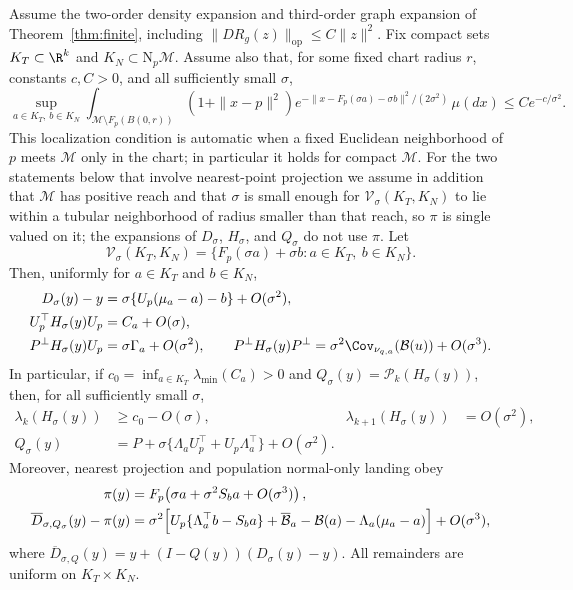 \documentclass[10pt]{article}
\theoremstyle{c2fup}
\newcommand{\M}{\mathcal{M}}
\newcommand{\N}{\mathrm{N}}
\newcommand{\op}{\mathrm{op}}
\begin{document}
\begin{theorem}
\label{thm:normal-boundary}
Assume the two-order density expansion and third-order graph expansion of
Theorem~\ref{thm:finite}, including
$\|DR_g(z)\|_\op\le C\|z\|^2$.  Fix compact sets
$K_T\subset\R^k$ and $K_N\subset\N_p\M$.  Assume also that, for some fixed chart radius
$r$, constants $c,C>0$, and all sufficiently small $\sigma$,
\begin{equation}
  \sup_{a\in K_T,\,b\in K_N}
  \int_{\M\setminus F_p(B(0,r))}
  (1+\|x-p\|^2)
  e^{-\|x-F_p(\sigma a)-\sigma b\|^2/(2\sigma^2)}\,\mu(dx)
  \le Ce^{-c/\sigma^2}.
  \label{eq:normal-boundary-localization}
\end{equation}
This localization condition is automatic when a fixed Euclidean
neighborhood of $p$ meets $\M$ only in the chart; in particular it holds
for compact $\M$.  For the two statements below that involve nearest-point projection we assume in addition that $\M$ has positive reach and that $\sigma$ is small enough for
$\mathcal V_\sigma(K_T,K_N)$ to lie within a tubular neighborhood of radius
smaller than that reach, so $\pi$ is single valued on it; the expansions of
$D_\sigma$, $H_\sigma$, and $Q_\sigma$ do not use $\pi$.  Let
\begin{equation}
  \mathcal V_\sigma(K_T,K_N)
  =\{F_p(\sigma a)+\sigma b:a\in K_T,\ b\in K_N\}.
  \label{eq:normal-boundary-set}
\end{equation}
Then, uniformly for $a\in K_T$ and $b\in K_N$,
\begin{align}
  D_\sigma(y)-y
  &=\sigma\{U_p(\mu_a-a)-b\}+O(\sigma^2),
  \label{eq:normal-boundary-mean}\\
  U_p^\top H_\sigma(y)U_p
  &=C_a+O(\sigma),\nonumber\\
  P^\perp H_\sigma(y)U_p
  &=\sigma\Gamma_a+O(\sigma^2),\qquad
  P^\perp H_\sigma(y)P^\perp
  =\sigma^2\Cov_{\nu_{q,a}}(\mathcal B(u))+O(\sigma^3).
  \label{eq:normal-boundary-blocks}
\end{align}
In particular, if $c_0=\inf_{a\in K_T}\lambda_{\min}(C_a)>0$ and
$Q_\sigma(y)=\mathcal P_k(H_\sigma(y))$, then, for all sufficiently small
$\sigma$,
\begin{align}
  \lambda_k(H_\sigma(y))&\ge c_0-O(\sigma),&
  \lambda_{k+1}(H_\sigma(y))&=O(\sigma^2),
  \label{eq:normal-boundary-gap}\\
  Q_\sigma(y)
  &=P+\sigma\{\Lambda_aU_p^\top+U_p\Lambda_a^\top\}
    +O(\sigma^2).
  \label{eq:normal-boundary-projector}
\end{align}
Moreover, nearest projection and population normal-only landing obey
\begin{align}
  \pi(y)
  &=F_p\!\left(\sigma a+\sigma^2S_ba+O(\sigma^3)\right),
  \label{eq:normal-boundary-projection}\\
  \overline D_{\sigma,Q_\sigma}(y)-\pi(y)
  &=\sigma^2\Bigl[
      U_p\{\Lambda_a^\top b-S_ba\}
      +\overline{\mathcal B}_a-\mathcal B(a)
      -\Lambda_a(\mu_a-a)
    \Bigr]+O(\sigma^3),
  \label{eq:normal-boundary-landing}
\end{align}
where
$\overline D_{\sigma,Q}(y)=y+(I-Q(y))(D_\sigma(y)-y)$.
All remainders are uniform on $K_T\times K_N$.


\end{theorem}
\end{document}
